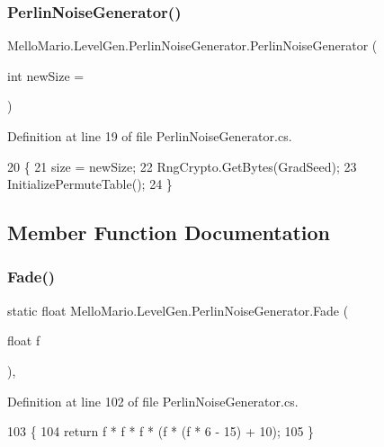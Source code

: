 \subsubsection{Perlin\+Noise\+Generator()}
{\footnotesize\ttfamily Mello\+Mario.\+Level\+Gen.\+Perlin\+Noise\+Generator.\+Perlin\+Noise\+Generator (\begin{DoxyParamCaption}\item[{int}]{new\+Size = {} }\end{DoxyParamCaption})}



Definition at line 19 of file Perlin\+Noise\+Generator.\+cs.


\begin{DoxyCode}
20         \{
21             size = newSize;
22             RngCrypto.GetBytes(GradSeed);
23             InitializePermuteTable();
24         \}
\end{DoxyCode}


\subsection{Member Function Documentation}
\mbox{\label{classMelloMario_1_1LevelGen_1_1PerlinNoiseGenerator_a79923427ba4d24b4dbfef1fe34686da0}} 
\subsubsection{Fade()}
{\footnotesize\ttfamily static float Mello\+Mario.\+Level\+Gen.\+Perlin\+Noise\+Generator.\+Fade (\begin{DoxyParamCaption}\item[{float}]{f }\end{DoxyParamCaption})\hspace{0.3cm}{\ttfamily [static]}, {\ttfamily [private]}}



Definition at line 102 of file Perlin\+Noise\+Generator.\+cs.


\begin{DoxyCode}
103         \{
104             \textcolor{keywordflow}{return} f * f * f * (f * (f * 6 - 15) + 10);
105         \}
\end{DoxyCode}
\mbox{\label{classMelloMario_1_1LevelGen_1_1PerlinNoiseGenerator_adf43d5fb4f21571bc832d5684b833c8c}} 
